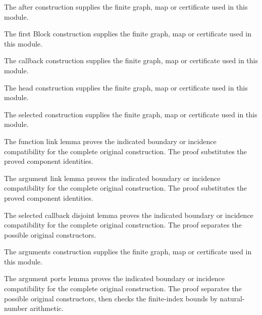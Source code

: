 The after construction supplies the finite graph, map or certificate used in this module.
\par{}

The first Block construction supplies the finite graph, map or certificate used in this module.
\par{}

The callback construction supplies the finite graph, map or certificate used in this module.
\par{}

The head construction supplies the finite graph, map or certificate used in this module.
\par{}

The selected construction supplies the finite graph, map or certificate used in this module.
\par{}

The function link lemma proves the indicated boundary or incidence compatibility for the complete original construction.
The proof substitutes the proved component identities.
\par{}

The argument link lemma proves the indicated boundary or incidence compatibility for the complete original construction.
The proof substitutes the proved component identities.
\par{}

The selected callback disjoint lemma proves the indicated boundary or incidence compatibility for the complete original construction.
The proof separates the possible original constructors.
\par{}

The arguments construction supplies the finite graph, map or certificate used in this module.
\par{}

The argument ports lemma proves the indicated boundary or incidence compatibility for the complete original construction.
The proof separates the possible original constructors, then checks the finite-index bounds by natural-number arithmetic.
\par{}

